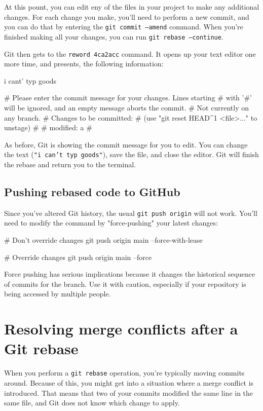 At this pount, you can edit eny of the files in your project to make any additional changes. For each change you make, you'll need to perform a new commit, and you can do that by entering the \texttt{git commit --amend} command. When you're finished making all your changes, you can run \texttt{git rebase --continue}.

Git then gets to the \texttt{reword 4ca2acc} command. It opens up your text editor one more time, and presents, the following information:
\begin{codeblock}[language=bash]
i cant' typ goods

# Please enter the commit message for your changes. Lines starting
# with '#' will be ignored, and an empty message aborts the commit.
# Not currently on any branch.
# Changes to be committed:
#   (use "git reset HEAD^1 <file>..." to unstage)
#
# modified:   a
#   
\end{codeblock}

As before, Git is showing the commit message for you to edit. You can change the text (\texttt{"i can't typ goods"}), save the file, and close the editor. Git will finish the rebase and return you to the terminal. 

\subsection{Pushing rebased code to GitHub}
Since you've altered Git history, the usual \texttt{git push origin} will not work. You'll need to modify the command by "force-pushing" your latest changes:
\begin{codeblock}[language=bash]
# Don't override changes
git push origin main --force-with-lease

# Override changes
git push origin main --force
\end{codeblock}

\begin{warningblock}
    Force pushing has serious implications because it changes the historical sequence of commits for the branch. Use it with caution, especially if your repository is being accessed by multiple people.
\end{warningblock}


\section{Resolving merge conflicts after a Git rebase}

When you perform a \texttt{git rebase} operation, you're typically moving commits around. Because of this, you might get into a situation where a merge conflict is introduced. That means that two of your commits modified the same line in the same file, and Git does not know which change to apply. 

